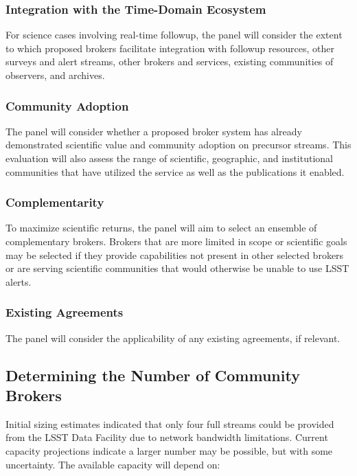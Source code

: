 \subsubsection{Integration with the Time-Domain Ecosystem}

For science cases involving real-time followup, the panel will consider the extent to which proposed brokers facilitate integration with followup resources, other surveys and alert streams, other brokers and services, existing communities of observers, and archives.  	


\subsubsection{Community Adoption}

The panel will consider whether a proposed broker system has already demonstrated scientific value and community adoption on precursor streams.  
This evaluation will also assess the 
range of scientific, geographic, and institutional communities that have utilized the service as well as the publications it enabled.


\subsubsection{Complementarity}

To maximize scientific returns, the panel will aim to select an ensemble of complementary brokers.
Brokers that are more limited in scope or scientific goals may be selected if they provide capabilities not present in other selected brokers or are serving scientific communities that would otherwise be unable to use LSST alerts.

\subsubsection{Existing Agreements}

The panel will consider the applicability of any existing agreements, if relevant.

\subsection{Determining the Number of Community Brokers} \label{sec:numbrokers}

Initial sizing estimates indicated that only four full streams could be provided from the LSST Data Facility due to network bandwidth limitations.  
Current capacity projections indicate a larger number may be possible, but with some uncertainty.
The available capacity will depend on:

